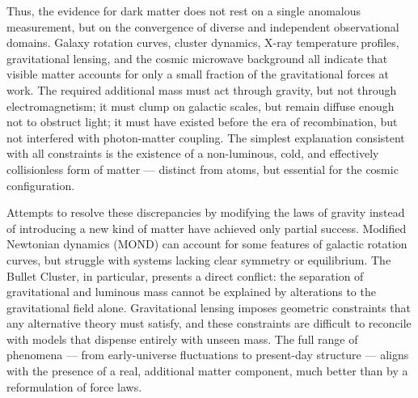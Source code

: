 Thus, the evidence for dark matter does not rest on a single anomalous measurement, but on the convergence of diverse and independent observational domains. Galaxy rotation curves, cluster dynamics, X-ray temperature profiles, gravitational lensing, and the cosmic microwave background all indicate that visible matter accounts for only a small fraction of the gravitational forces at work. The required additional mass must act through gravity, but not through electromagnetism; it must clump on galactic scales, but remain diffuse enough not to obstruct light; it must have existed before the era of recombination, but not interfered with photon-matter coupling. The simplest explanation consistent with all constraints is the existence of a non-luminous, cold, and effectively collisionless form of matter — distinct from atoms, but essential for the cosmic configuration.

Attempts to resolve these discrepancies by modifying the laws of gravity instead of introducing a new kind of matter have achieved only partial success. Modified Newtonian dynamics (MOND) can account for some features of galactic rotation curves, but struggle with systems lacking clear symmetry or equilibrium. The Bullet Cluster, in particular, presents a direct conflict: the separation of gravitational and luminous mass cannot be explained by alterations to the gravitational field alone. Gravitational lensing imposes geometric constraints that any alternative theory must satisfy, and these constraints are difficult to reconcile with models that dispense entirely with unseen mass. The full range of phenomena — from early-universe fluctuations to present-day structure — aligns with the presence of a real, additional matter component, much better than by a reformulation of force laws.
